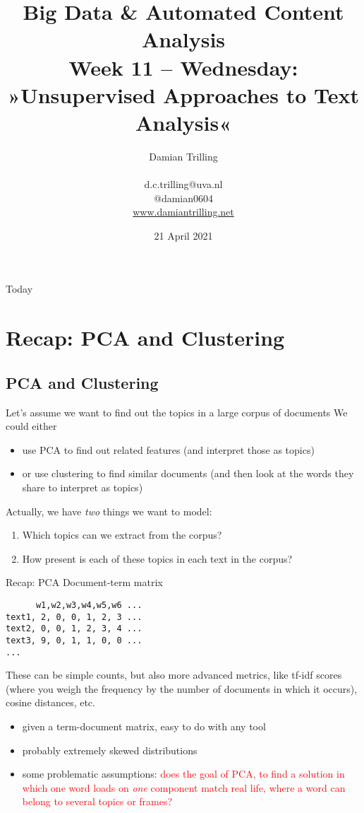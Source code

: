 \documentclass[compress]{beamer}
\title[Big Data and Automated Content Analysis]{\textbf{Big Data \& Automated Content Analysis} \\ Week 11 -- Wednesday: »Unsupervised Approaches to Text Analysis«}
\author[Damian Trilling]{Damian Trilling \\ ~ \\ \footnotesize{d.c.trilling@uva.nl \\@damian0604} \\ \url{www.damiantrilling.net}}
\date{21 April 2021}
\institute[UvA]{Afdeling Communicatiewetenschap \\Universiteit van Amsterdam}
\begin{document}
	
	\begin{frame}{}
		\titlepage
	\end{frame}
	
	\begin{frame}{Today}
		\tableofcontents
	\end{frame}
	




\section[Recap]{Recap: PCA and Clustering}

\subsection*{PCA and Clustering}


\begin{frame}{Let's assume we want to find out the topics in a large corpus of documents}
We could either
\begin{itemize}
	\item use PCA to find out related features (and interpret those as topics)
	\item or use clustering to find similar documents (and then look at the words they share to interpret as topics)
\end{itemize}

\pause

Actually, we have \emph{two} things we want to model:

\begin{enumerate}
	\item Which topics can we extract from the corpus?
	\item How present is each of these topics in each text in the corpus?
\end{enumerate}

\end{frame}


\begin{frame}[fragile]{Recap: PCA}
Document-term matrix
\begin{lstlisting}
      w1,w2,w3,w4,w5,w6 ...
text1, 2, 0, 0, 1, 2, 3 ...
text2, 0, 0, 1, 2, 3, 4 ...
text3, 9, 0, 1, 1, 0, 0 ...
...
\end{lstlisting}
{\small{These can be simple counts, but also more advanced metrics, like tf-idf scores (where you weigh the frequency by the number of documents in which it occurs), cosine distances, etc.}}
\pause
	\begin{itemize}
	\item given a term-document matrix, easy to do with any tool
	\item probably extremely skewed distributions
	\item some problematic assumptions: \textcolor{red}{does the goal of PCA, to find a solution in which one word loads on \emph{one} component match real life, where a word can belong to several topics or frames?}
\end{itemize}

\end{frame}
\end{document}
